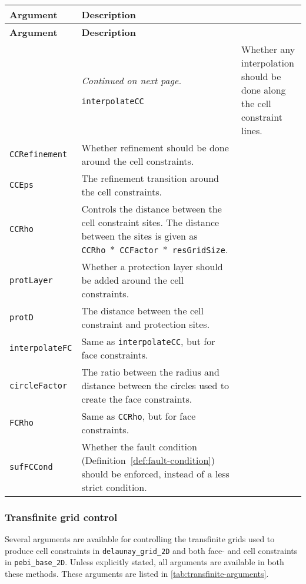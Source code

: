 \begin{tabularx}{\textwidth}{l X}
    \caption{Arguments controlling constraint creation in \texttt{pebiGrid2DGmsh}.}
    \label{tab:constraint-arguments} \\
    \toprule \textbf{Argument} & \textbf{Description} \\\midrule \endfirsthead
    \textbf{Argument} & \textbf{Description} \\\midrule \endhead
    \bottomrule & \textit{Continued on next page.} \endfoot
    \bottomrule \endlastfoot
    
    \texttt{interpolateCC} & Whether any interpolation should be done along the cell constraint lines. \\
    \texttt{CCRefinement} & Whether refinement should be done around the cell constraints. \\
    \texttt{CCEps} & The refinement transition around the cell constraints. \\
    \texttt{CCRho} & Controls the distance between the cell constraint sites. The distance between the sites is given as \texttt{CCRho}~*~\texttt{CCFactor}~*~\texttt{resGridSize}. \\
    \texttt{protLayer} & Whether a protection layer should be added around the cell constraints. \\
    \texttt{protD} & The distance between the cell constraint and protection sites. \\
    \texttt{interpolateFC} & Same as \texttt{interpolateCC}, but for face constraints. \\
    \texttt{circleFactor} & The ratio between the radius and distance between the circles used to create the face constraints. \\
    \texttt{FCRho} & Same as \texttt{CCRho}, but for face constraints. \\
    \texttt{sufFCCond} & Whether the fault condition (Definition~\ref{def:fault-condition}) should be enforced, instead of a less strict condition. \\
\end{tabularx}



\subsubsection{Transfinite grid control}
Several arguments are available for controlling the transfinite grids used to produce cell constraints in \verb|delaunay_grid_2D| and both face- and cell constraints in \verb|pebi_base_2D|. Unless explicitly stated, all arguments are available in both these methods. These arguments are listed in \autoref{tab:transfinite-arguments}.

